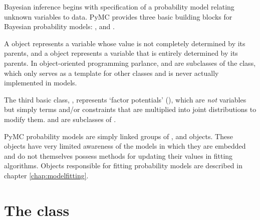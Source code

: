 
Bayesian inference begins with specification of a probability model relating unknown variables to data. PyMC provides three basic building blocks for Bayesian probability models: ,  and .

A  object represents a variable whose value is not completely determined by its parents, and a  object represents a variable that is entirely determined by its parents. In object-oriented programming parlance,  and  are subclasses of the  class, which only serves as a template for other classes and is never actually implemented in models.

The third basic class, , represents `factor potentials' (\cite{dawidmarkov,Jordan:2004p5439}), which are \emph{not} variables but simply terms and/or constraints that are multiplied into joint distributions to modify them.  and  are subclasses of .



\medskip
PyMC probability models are simply linked groups of ,  and  objects. These objects have very limited awareness of the models in which they are embedded and do not themselves possess methods for updating their values in fitting algorithms. Objects responsible for fitting probability models are described in chapter \ref{chap:modelfitting}.


\hypertarget{stochastic}{}
\section[The Stochastic class]{The  class}
\label{stochastic}

